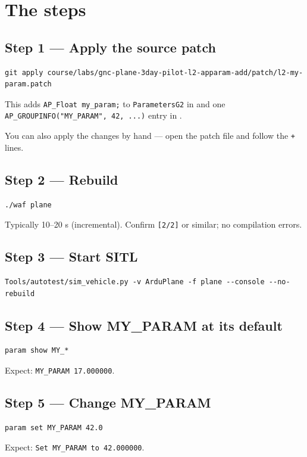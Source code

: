 \documentclass[a4paper,11pt,twoside]{article}
\begin{document}
\section*{The steps}

\subsection*{Step 1 --- Apply the source patch}
\begin{Verbatim}[frame=single,fontsize=\small]
git apply course/labs/gnc-plane-3day-pilot-l2-apparam-add/patch/l2-my-param.patch
\end{Verbatim}
This adds \texttt{AP\_Float my\_param;} to \texttt{ParametersG2} in  and one \texttt{AP\_GROUPINFO("MY\_PARAM", 42, ...)} entry in .

You can also apply the changes by hand --- open the patch file and follow the \texttt{+} lines.

\subsection*{Step 2 --- Rebuild}
\begin{Verbatim}[frame=single,fontsize=\small]
./waf plane
\end{Verbatim}
Typically 10--20 s (incremental). Confirm \texttt{[2/2]} or similar; no compilation errors.

\subsection*{Step 3 --- Start SITL}
\begin{Verbatim}[frame=single,fontsize=\small]
Tools/autotest/sim_vehicle.py -v ArduPlane -f plane --console --no-rebuild
\end{Verbatim}

\subsection*{Step 4 --- Show MY\_PARAM at its default}
\begin{Verbatim}[frame=single,fontsize=\small]
param show MY_*
\end{Verbatim}
Expect: \texttt{MY\_PARAM 17.000000}.

\subsection*{Step 5 --- Change MY\_PARAM}
\begin{Verbatim}[frame=single,fontsize=\small]
param set MY_PARAM 42.0
\end{Verbatim}
Expect: \texttt{Set MY\_PARAM to 42.000000}.
\end{document}
